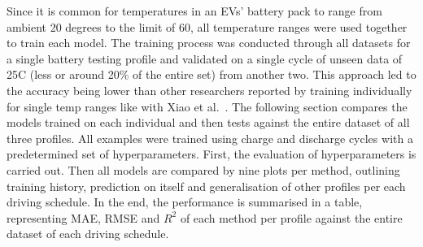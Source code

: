 %
Since it is common for temperatures in an EVs' battery pack to range from ambient 20 degrees to the limit of 60, all temperature ranges were used together to train each model.
The training process was conducted through all datasets for a single battery testing profile and validated on a single cycle of unseen data of 25\textdegree{}C (less or around 20\% of the entire set) from another two. 
This approach led to the accuracy being lower than other researchers reported by training individually for single temp ranges like with Xiao et al.~\cite{xiao_accurate_2019}.
The following section compares the models trained on each individual and then tests against the entire dataset of all three profiles.
All examples were trained using charge and discharge cycles with a predetermined set of hyperparameters. %
First, the evaluation of hyperparameters is carried out.
Then all models are compared by nine plots per method, outlining training history, prediction on itself and generalisation of other profiles per each driving schedule.
In the end, the performance is summarised in a table, representing MAE, RMSE and $R^2$ of each method per profile against the entire dataset of each driving schedule.
%

%

